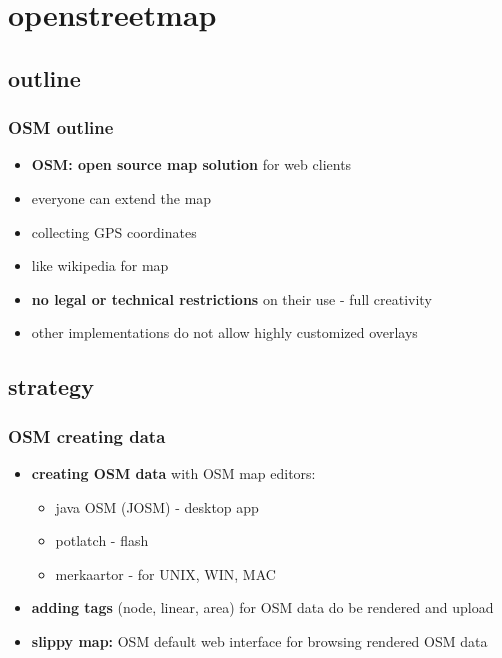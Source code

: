 \documentclass[blue]{beamer}
\begin{document}

\section{openstreetmap}
\subsection{outline}
\frame
{
\frametitle{\textbf{OSM outline}}
\begin{itemize}
	\item \textbf{OSM: open source map solution} for web clients
	\item everyone can extend the map
	\item collecting GPS coordinates
	\item like wikipedia for map
	\item \textbf{no legal or technical restrictions} on their use - full creativity
	\item other implementations do not allow highly customized overlays
\end{itemize}
}

\subsection{strategy}
\frame
{
\frametitle{\textbf{OSM creating data}}
\begin{itemize}
	\item \textbf{creating OSM data} with OSM map editors:
	\begin{itemize}
			\item java OSM (JOSM) - desktop app
			\item potlatch - flash
			\item merkaartor - for UNIX, WIN, MAC
	\end{itemize}
	\item \textbf{adding tags} (node, linear, area) for OSM data do be rendered and upload
	\item \textbf{slippy map:} OSM default web interface for browsing rendered OSM data
\end{itemize}
}
\end{document}
